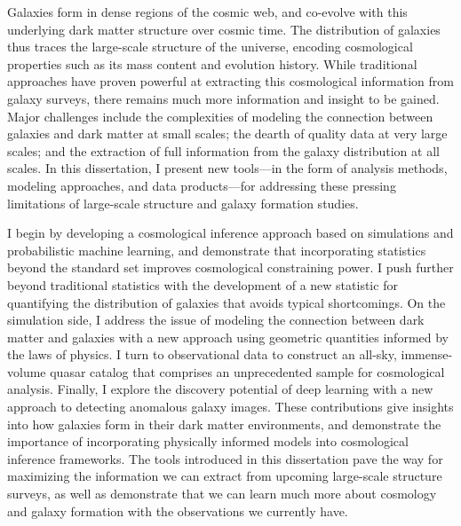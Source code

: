 Galaxies form in dense regions of the cosmic web, and co-evolve with this underlying dark matter structure over cosmic time.
The distribution of galaxies thus traces the large-scale structure of the universe, encoding cosmological properties such as its mass content and evolution history.
While traditional approaches have proven powerful at extracting this cosmological information from galaxy surveys, there remains much more information and insight to be gained.
Major challenges include the complexities of modeling the connection between galaxies and dark matter at small scales; the dearth of quality data at very large scales; and the extraction of full information from the galaxy distribution at all scales.
In this dissertation, I present new tools---in the form of analysis methods, modeling approaches, and data products---for addressing these pressing limitations of large-scale structure and galaxy formation studies.

I begin by developing a cosmological inference approach based on simulations and probabilistic machine learning, and demonstrate that incorporating statistics beyond the standard set improves cosmological constraining power.
I push further beyond traditional statistics with the development of a new statistic for quantifying the distribution of galaxies that avoids typical shortcomings.
On the simulation side, I address the issue of modeling the connection between dark matter and galaxies with a new approach using geometric quantities informed by the laws of physics.
I turn to observational data to construct an all-sky, immense-volume quasar catalog that comprises an unprecedented sample for cosmological analysis.
Finally, I explore the discovery potential of deep learning with a new approach to detecting anomalous galaxy images.
These contributions give insights into how galaxies form in their dark matter environments, and demonstrate the importance of incorporating physically informed models into cosmological inference frameworks.
The tools introduced in this dissertation pave the way for maximizing the information we can extract from upcoming large-scale structure surveys, as well as demonstrate that we can learn much more about cosmology and galaxy formation with the observations we currently have.